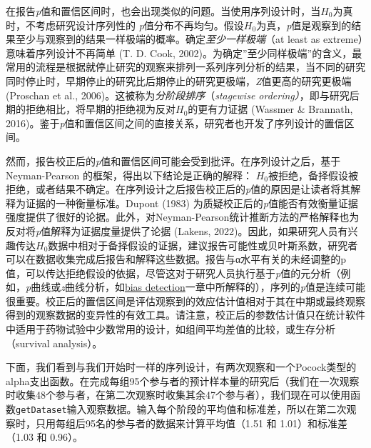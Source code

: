 \documentclass[
  letterpaper,
  DIV=11,
  numbers=noendperiod]{scrreprt}
\begin{document}
在报告\emph{p}值和置信区间时，也会出现类似的问题。当使用序列设计时，当\(H_0\)为真时，不考虑研究设计序列性的
\emph{p}值分布不再均匀。假设\(H_0\)为真，\emph{p}值是观察到的结果至少与观察到的结果一样极端的概率。确定\emph{至少一样极端}（at
least as extreme）意味着序列设计不再简单 (T. D. Cook,
2002)。为确定''至少同样极端''的含义，最常用的流程是根据就停止研究的观察来排列一系列序列分析的结果，当不同的研究同时停止时，早期停止的研究比后期停止的研究更极端，\emph{Z}值更高的研究更极端
(Proschan et al., 2006)。这被称为\emph{分阶段排序}（\emph{stagewise
ordering）}，即与研究后期的拒绝相比，将早期的拒绝视为反对\(H_0\)的更有力证据
(Wassmer \& Brannath,
2016)。鉴于\emph{p}值和置信区间之间的直接关系，研究者也开发了序列设计的置信区间。

然而，报告校正后的\emph{p}值和置信区间可能会受到批评。在序列设计之后，基于Neyman-Pearson
的框架，得出以下结论是正确的解释：
\(H_0\)被拒绝，备择假设被拒绝，或者结果不确定。在序列设计之后报告校正后的\emph{p}值的原因是让读者将其解释为证据的一种衡量标准。Dupont
(1983)
为质疑校正后的\emph{p}值能否有效衡量证据强度提供了很好的论据。此外，对Neyman-Pearson统计推断方法的严格解释也为反对将\emph{p}值解释为证据度量提供了论据
(Lakens,
2022)。因此，如果研究人员有兴趣传达\(H_0\)数据中相对于备择假设的证据，建议报告可能性或贝叶斯系数，研究者可以在数据收集完成后报告和解释这些数据。报告与α水平有关的未经调整的p值，可以传达拒绝假设的依据，尽管这对于研究人员执行基于\emph{p}值的元分析（例如，\emph{p}曲线或\emph{z}曲线分析，如\protect\hyperlink{bias}{bias
detection}一章中所解释的），序列的\emph{p}值是连续可能很重要。校正后的置信区间是评估观察到的效应估计值相对于其在中期或最终观察得到的观察数据的变异性的有效工具。请注意，校正后的参数估计值只在统计软件中适用于药物试验中少数常用的设计，如组间平均差值的比较，或生存分析（survival
analysis）。

下面，我们看到与我们开始时一样的序列设计，有两次观察和一个Pocock类型的alpha支出函数。在完成每组95个参与者的预计样本量的研究后（我们在一次观察时收集48个参与者，在第二次观察时收集其余47个参与者），我们现在可以使用函数\texttt{getDataset}输入观察数据。输入每个阶段的平均值和标准差，所以在第二次观察时，只用每组后95名的参与者的数据来计算平均值（1.51
和 1.01）和标准差（1.03 和 0.96）。
\end{document}

